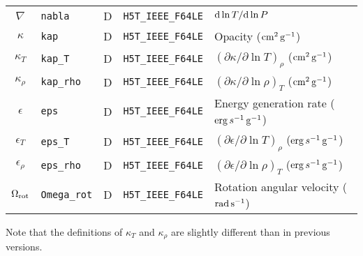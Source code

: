 \documentclass{article}
\newcommand{\diff}{\ensuremath{{\rm d}}}
\newcommand{\cm}{\ensuremath{{\rm cm}}}
\newcommand{\gram}{\ensuremath{{\rm g}}}
\newcommand{\second}{\ensuremath{{\rm s}}}
\newcommand{\erg}{\ensuremath{{\rm erg}}}
\begin{document}
\begin{table}[h!]
\begin{tabular}{|c|l|c|l|l|}
$\nabla$          & \texttt{nabla}        & D & \texttt{H5T\_IEEE\_F64LE} & $\diff \ln T/\diff \ln P$ \\
$\kappa$          & \texttt{kap}       & D &  \texttt{H5T\_IEEE\_F64LE} & Opacity ($\cm^{2}\,\gram^{-1}$) \\
$\kappa_{T}$      & \texttt{kap\_T}     & D &  \texttt{H5T\_IEEE\_F64LE} & $(\partial \kappa/\partial \ln T)_{\rho}$ ($\cm^{2}\,\gram^{-1}$) \\
$\kappa_{\rho}$   & \texttt{kap\_rho}   & D &  \texttt{H5T\_IEEE\_F64LE} & $(\partial \kappa/\partial \ln \rho)_{T}$ ($\cm^{2}\,\gram^{-1}$) \\
$\epsilon$        & \texttt{eps}      & D &  \texttt{H5T\_IEEE\_F64LE} & Energy generation rate ($\erg\,s^{-1}\,\gram^{-1}$) \\
$\epsilon_{T}$    & \texttt{eps\_T}   & D &  \texttt{H5T\_IEEE\_F64LE} & $(\partial \epsilon/\partial \ln T)_{\rho}$ ($\erg\,s^{-1}\,\gram^{-1}$) \\
$\epsilon_{\rho}$ & \texttt{eps\_rho} & D &  \texttt{H5T\_IEEE\_F64LE} & $(\partial \epsilon/\partial \ln \rho)_{T}$ ($\erg\,s^{-1}\,\gram^{-1}$) \\
$\Omega_{\rm rot}$ & \texttt{Omega\_rot}   & D & \texttt{H5T\_IEEE\_F64LE} & Rotation angular velocity (${\rm rad}\,\second^{-1}$) \\  \hline
\end{tabular}
\end{table}

Note that the definitions of $\kappa_{T}$ and $\kappa_{\rho}$ are
slightly different than in previous versions.
\end{document}

